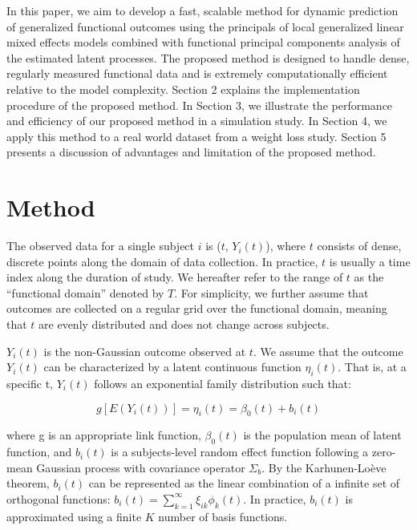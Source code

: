 \documentclass[
  11pt,
]{article}
\begin{document}
In this paper, we aim to develop a fast, scalable method for dynamic
prediction of generalized functional outcomes using the principals of
local generalized linear mixed effects models combined with functional
principal components analysis of the estimated latent processes. The
proposed method is designed to handle dense, regularly measured
functional data and is extremely computationally efficient relative to
the model complexity. Section 2 explains the implementation procedure of
the proposed method. In Section 3, we illustrate the performance and
efficiency of our proposed method in a simulation study. In Section 4,
we apply this method to a real world dataset from a weight loss study.
Section 5 presents a discussion of advantages and limitation of the
proposed method.

\hypertarget{method}{%
\section{Method}\label{method}}

The observed data for a single subject \(i\) is (\(t\), \(Y_i(t)\)),
where \(t\) consists of dense, discrete points along the domain of data
collection. In practice, \(t\) is usually a time index along the
duration of study. We hereafter refer to the range of \(t\) as the
``functional domain'' denoted by \(T\). For simplicity, we further
assume that outcomes are collected on a regular grid over the functional
domain, meaning that \(t\) are evenly distributed and does not change
across subjects.

\(Y_i(t)\) is the non-Gaussian outcome observed at \(t\). We assume that
the outcome \(Y_i(t)\) can be characterized by a latent continuous
function \(\eta_i(t)\). That is, at a specific t, \(Y_i(t)\) follows an
exponential family distribution such that:

\[
g[E(Y_i(t))] = \eta_i(t) = \beta_0(t)+b_i(t)
\]

where g is an appropriate link function, \(\beta_0(t)\) is the
population mean of latent function, and \(b_i(t)\) is a subjects-level
random effect function following a zero-mean Gaussian process with
covariance operator \(\Sigma_b\). By the Karhunen-Loève theorem,
\(b_i(t)\) can be represented as the linear combination of a infinite
set of orthogonal functions:
\(b_i(t)=\sum_{k=1}^{\infty}\xi_{ik}\phi_{k}(t)\). In practice,
\(b_i(t)\) is approximated using a finite \(K\) number of basis
functions.
\end{document}
